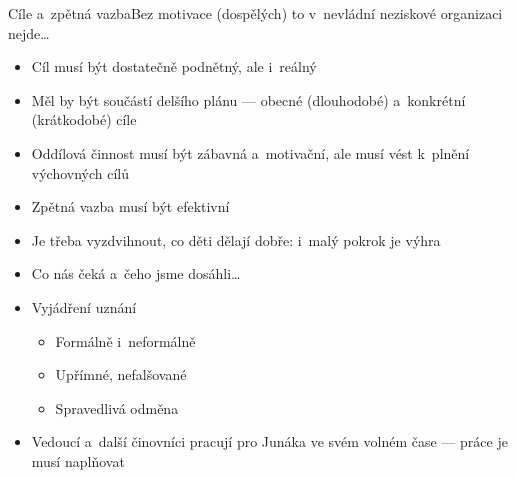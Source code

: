 \documentclass[compress, ucs, xelatex, xcolor=dvipsnames, print,
  hyperref={
    bookmarks=true,
    unicode=true,
    colorlinks=true,
    plainpages=false,
    pdfkeywords={Skaut, Junak, Skauting, Vychovna metoda},
    linkcolor=Black,
    anchorcolor=Black,
    citecolor=OliveGreen,
    filecolor=OliveGreen,
    menucolor=Black,
    urlcolor=OliveGreen,
    pdftex}
  ]{beamer}
\begin{document}
\begin{frame}{Cíle a~zpětná vazba}{Bez motivace (dospělých) to v~nevládní neziskové organizaci nejde\ldots}
  \begin{multicols}{2}
    \begin{itemize}
      \item Cíl musí být dostatečně podnětný, ale i~reálný
      \item Měl by být součástí delšího plánu --- obecné (dlouhodobé) a~konkrétní (krátkodobé) cíle
      \item Oddílová činnost musí být zábavná a~motivační, ale musí vést k~plnění výchovných cílů
      \item Zpětná vazba musí být efektivní
      \item Je třeba vyzdvihnout, co děti dělají dobře: i~malý pokrok je výhra
      \item Co nás čeká a~čeho jsme dosáhli\ldots
      \item Vyjádření uznání
      \begin{itemize}
	\item Formálně i~neformálně
	\item Upřímné, nefalšované
	\item Spravedlivá odměna
      \end{itemize}
    \end{itemize}
  \end{multicols}
  \begin{itemize}
    \item Vedoucí a~další činovníci pracují pro Junáka ve svém volném čase --- práce je musí naplňovat
  \end{itemize}
\end{frame}
\end{document}
